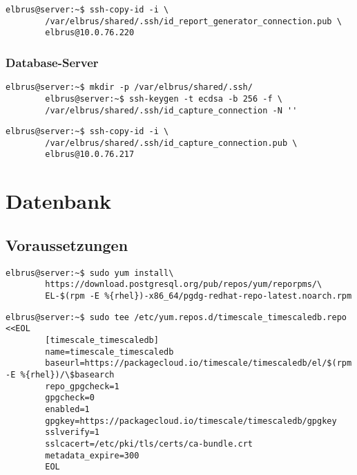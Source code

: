 \documentclass{article}
\begin{document}
	\begin{lstlisting}[caption={Übertragen der SSH-Keys auf den Database-Server.}]
		elbrus@server:~$ ssh-copy-id -i \
		/var/elbrus/shared/.ssh/id_report_generator_connection.pub \
		elbrus@10.0.76.220
	\end{lstlisting}
	
	\subsubsection{Database-Server}
	\begin{lstlisting}[caption={Anlegen der SSH-Keys.}]
		elbrus@server:~$ mkdir -p /var/elbrus/shared/.ssh/
		elbrus@server:~$ ssh-keygen -t ecdsa -b 256 -f \
		/var/elbrus/shared/.ssh/id_capture_connection -N ''
	\end{lstlisting}
	
	\begin{lstlisting}[caption={Übertragen der SSH-Keys auf den Capture-Server.}]
		elbrus@server:~$ ssh-copy-id -i \
		/var/elbrus/shared/.ssh/id_capture_connection.pub \
		elbrus@10.0.76.217
	\end{lstlisting}
	
	\newpage
	\section{Datenbank}
	\subsection[dependencies]{Voraussetzungen}
	\lstset{style=commands}
	\begin{lstlisting}[caption={Hinzufügen des PostgreSQL Drittanbieter-Repository, um die neuesten PostgreSQL-Pakete zu erhalten.}]
		elbrus@server:~$ sudo yum install\
		https://download.postgresql.org/pub/repos/yum/reporpms/\
		EL-$(rpm -E %{rhel})-x86_64/pgdg-redhat-repo-latest.noarch.rpm
	\end{lstlisting}

	\lstset{style=commands}
	\begin{lstlisting}[caption={Erstellen des Timescale repository.}]
		elbrus@server:~$ sudo tee /etc/yum.repos.d/timescale_timescaledb.repo <<EOL
		[timescale_timescaledb]
		name=timescale_timescaledb
		baseurl=https://packagecloud.io/timescale/timescaledb/el/$(rpm -E %{rhel})/\$basearch
		repo_gpgcheck=1
		gpgcheck=0
		enabled=1
		gpgkey=https://packagecloud.io/timescale/timescaledb/gpgkey
		sslverify=1
		sslcacert=/etc/pki/tls/certs/ca-bundle.crt
		metadata_expire=300
		EOL
	\end{lstlisting}
\end{document}
